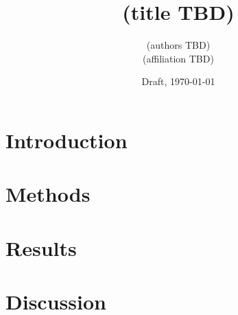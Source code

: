 \documentclass[11pt]{article}
\title{(title TBD)}
\author{(authors TBD) \\ \small (affiliation TBD)}
\date{Draft, \today}
\begin{document}
\maketitle

\begin{abstract}
\end{abstract}


\section{Introduction}
\label{sec:intro}


\section{Methods}
\label{sec:methods}


\section{Results}
\label{sec:results}


\section{Discussion}
\label{sec:discussion}




\end{document}

